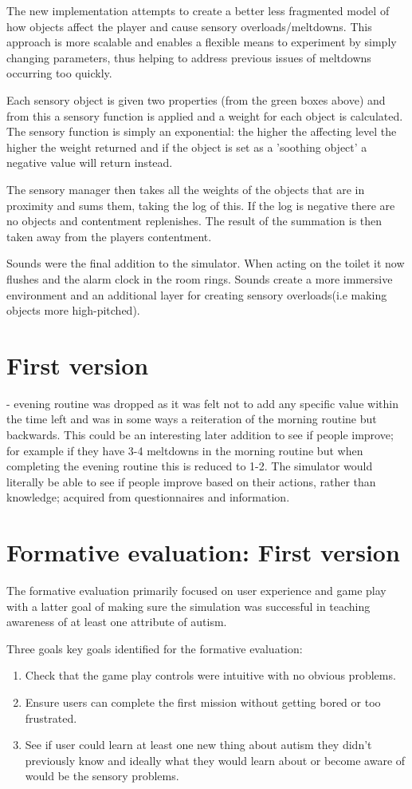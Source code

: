\documentclass[11pt]{report}
\begin{document}
The new implementation attempts to create a better less fragmented model of how objects affect the player and cause sensory overloads/meltdowns. This approach is more scalable and enables a flexible means to experiment by simply changing parameters, thus helping to address previous issues of meltdowns occurring too quickly.

Each sensory object is given two properties (from the green boxes above) and from this a sensory function is applied and a weight for each object is calculated. The sensory function is simply an exponential: the higher the affecting level the higher the weight returned and if the object is set as a 'soothing object' a negative value will return instead. 

The sensory manager then takes all the weights of the objects that are in proximity and sums them, taking the log of this. If the log is negative there are no objects and contentment replenishes. The result of the summation is then taken away from the players contentment. 

Sounds were the final addition to the simulator. When acting on the toilet it now flushes and the alarm clock in the room rings. Sounds create a more immersive environment and an additional layer for creating sensory overloads(i.e making objects more high-pitched). 

\chapter{First version}
- evening routine was dropped as it was felt not to add any specific value within the time left and was in some ways a reiteration of the morning routine but backwards. This could be an interesting later addition to see if people improve; for example if they have 3-4 meltdowns in the morning routine but when completing the evening routine this is reduced to 1-2. The simulator would literally be able to see if people improve based on their actions, rather than knowledge; acquired from questionnaires and information. 

\chapter{Formative evaluation: First version}
The formative evaluation primarily focused on user experience and game play with a latter goal of making sure the simulation was successful in teaching awareness of at least one attribute of autism. 

Three goals key goals identified for the formative evaluation: 
\begin{enumerate}
\item Check that the game play controls were intuitive with no obvious problems. 
\item Ensure users can complete the first mission without getting bored or too frustrated. 
\item See if user could learn at least one new thing about autism they didn't previously know and ideally what they would learn about or become aware of would be the sensory problems.
\end{enumerate}
\end{document}
